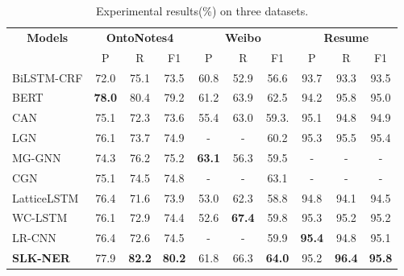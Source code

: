 \documentclass[conference]{IEEEtran}
\begin{document}
    \begin{table*}[h]
        \caption{Experimental results(\%) on three datasets.
         }\label{result1}
\centering
\begin{tabular}{
|l|c|c|c|
            c|c|c|
            c|c|c|}
        \hline
\multicolumn{1}{|c|}{\multirow{2}{*}{\textbf{Models}}} 
        & \multicolumn{3}{c|}{\textbf{OntoNotes4}}  
        & \multicolumn{3}{c|}{\textbf{Weibo}}  
        & \multicolumn{3}{c|}{\textbf{Resume}}       
\\
        \cline{2-10}  

        & P & R & F1
        & P &R & F1
        & P & R & F1
\\
        \hline
BiLSTM-CRF\cite{huang2015bidirectional}  
            & 72.0	& 75.1	& 73.5
            & 60.8	& 52.9	& 56.6
            & 93.7	& 93.3	& 93.5
\\ 
        BERT\cite{devlin-etal-2019-bert}        
            &\textbf{78.0}	& 80.4	& 79.2     
            &61.2	            & 63.9	& 62.5 
            &94.2	            & 95.8	& 95.0
\\
        CAN\cite{zhu2019can}  
            &75.1   &72.3   &73.6
            &55.4   &63.0   &59.3.
            &95.1   &94.8   &94.9
            \\
        \hline
        LGN\cite{gui2019lexicon}                
            & 76.1	& 73.7	& 74.9
            & {-}	&{-} 	& 60.2
            & 95.3	& 95.5	& 95.4 
\\
        MG-GNN\cite{ding2019neural}   
            &  74.3	            & 76.2	& 75.2
            & \textbf{63.1}	& 56.3	& 59.5
            & {-}    &{-}    &  {-}   
\\
        CGN\cite{sui2019leverage}  
            &75.1 &74.5 &74.8
            &-   &  -   &63.1
            &{-}    &{-}    &  {-}  
            \\
        \hline
LatticeLSTM\cite{zhang2018chinese}
            &  76.4	& 71.6	& 73.9
            &  53.0	& 62.3	& 58.8
            &  94.8	& 94.1	& 94.5
\\
        WC-LSTM\cite{liu2019encoding}  
            & 76.1	& 72.9	& 74.4
            & 52.6	& \textbf{67.4}	& 59.8
            & 95.3	& 95.2	& 95.2
\\
        LR-CNN\cite{gui2019cnn}
            & 76.4	            & 72.6	& 74.5
            & -	                &-  	& 59.9  
            &\textbf{95.4}	&94.8	& 95.1
\\ 
         
        \hline


\textbf{SLK-NER} 
            & 77.9	&\textbf{82.2}	&\textbf{80.2}
            & 61.8	& 66.3              &\textbf{64.0}
            & 95.2	&\textbf{96.4}	&\textbf{95.8}
\\
        \hline
\end{tabular}
\end{table*}
    
\end{document}

